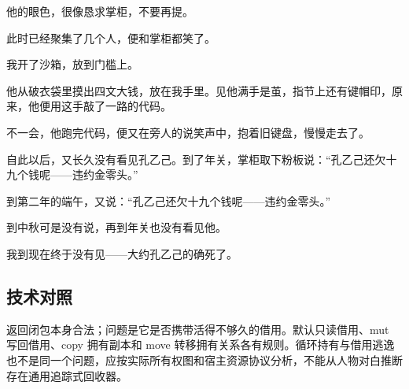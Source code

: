 他的眼色，很像恳求掌柜，不要再提。

此时已经聚集了几个人，便和掌柜都笑了。

我开了沙箱，放到门槛上。

他从破衣袋里摸出四文大钱，放在我手里。见他满手是茧，指节上还有键帽印，原来，他便用这手敲了一路的代码。

不一会，他跑完代码，便又在旁人的说笑声中，抱着旧键盘，慢慢走去了。

自此以后，又长久没有看见孔乙己。到了年关，掌柜取下粉板说：“孔乙己还欠十九个钱呢——违约金零头。”

到第二年的端午，又说：“孔乙己还欠十九个钱呢——违约金零头。”

到中秋可是没有说，再到年关也没有看见他。

我到现在终于没有见——大约孔乙己的确死了。

\subsection*{技术对照}

返回闭包本身合法；问题是它是否携带活得不够久的借用。默认只读借用、mut 写回借用、copy 拥有副本和 move 转移拥有关系各有规则。循环持有与借用逃逸也不是同一个问题，应按实际所有权图和宿主资源协议分析，不能从人物对白推断存在通用追踪式回收器。
